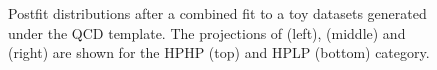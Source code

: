 \begin{figure}[h!]
\caption{Postfit distributions after a combined fit to a toy datasets generated under the QCD \HERWIG{++} template. The projections of \MJO (left), \MJT (middle) and \MVV (right) are shown for the HPHP (top) and HPLP (bottom) category.}
\label{fig:postfitHerwig}
\end{figure}

